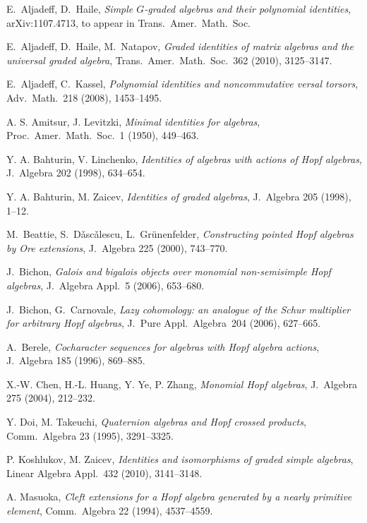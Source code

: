 \documentclass[11pt, a4paper]{amsart}
\theoremstyle{definition}
\numberwithin{equation}{section}
\begin{document}
\begin{thebibliography}{99}

E.~Aljadeff, D.~Haile,
\emph{Simple $G$-graded algebras and their polynomial identities},
arXiv:1107.4713, to appear in Trans.\ Amer.\ Math.\ Soc.

E.~Aljadeff, D.~Haile, M.~Natapov,
\emph{Graded identities of matrix algebras and the universal graded algebra},
Trans.\ Amer.\ Math.\ Soc.~362 (2010), 3125--3147.

E.~Aljadeff, C.~Kassel,
\emph{Polynomial identities and noncommutative versal torsors},
Adv.\ Math.~218 (2008), 1453--1495.

A. S. Amitsur, J. Levitzki,
\emph{Minimal identities for algebras},
Proc.\ Amer.\ Math.\ Soc.~1 (1950), 449--463. 

Y. A. Bahturin, V. Linchenko,
\emph{Identities of algebras with actions of Hopf algebras},
J.~Algebra 202 (1998), 634--654.

Y. A. Bahturin, M. Zaicev, 
\emph{Identities of graded algebras},
J.~Algebra 205 (1998), 1--12.

M.~Beattie, S.~D\v asc\v alescu, L.~Gr\"unenfelder, 
\emph{Constructing pointed Hopf algebras by Ore extensions},
J.~Algebra 225 (2000), 743--770. 

J.~Bichon, 
\emph{Galois and bigalois objects over monomial non-semisimple Hopf algebras},
J.~Algebra Appl.~5 (2006), 653--680.

J.~Bichon, G.~Carnovale, 
\emph{Lazy cohomology: an analogue of the Schur multiplier for arbitrary Hopf algebras},  
J.~Pure Appl.\ Algebra~204 (2006), 627--665.

A.~Berele, 
\emph{Cocharacter sequences for algebras with Hopf algebra actions}, 
J.~Algebra 185 (1996), 869--885.

X.-W. Chen, H.-L. Huang, Y. Ye, P. Zhang, 
\emph{Monomial Hopf algebras}, 
J.~Algebra 275 (2004), 212--232.

 Y. Doi, M. Takeuchi, 
\emph{Quaternion algebras and Hopf crossed products},
Comm.\ Algebra 23 (1995), 3291--3325.

P. Koshlukov, M. Zaicev, 
\emph{Identities and isomorphisms of graded simple algebras}, 
Linear Algebra Appl.~432 (2010), 3141--3148.

 A. Masuoka,
\textit{Cleft extensions for a Hopf algebra generated by a nearly primitive element},
Comm.\ Algebra 22 (1994), 4537--4559.


\end{thebibliography}
\end{document}
